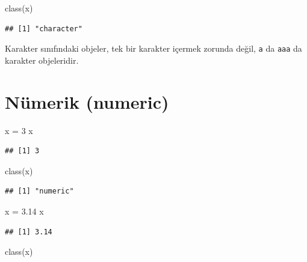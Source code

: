 \documentclass[
]{book}
\newenvironment{Shaded}{\begin{snugshade}}{\end{snugshade}}
\newcommand{\DecValTok}[1]{\textcolor[rgb]{0.00,0.00,0.81}{#1}}
\newcommand{\FloatTok}[1]{\textcolor[rgb]{0.00,0.00,0.81}{#1}}
\newcommand{\FunctionTok}[1]{\textcolor[rgb]{0.00,0.00,0.00}{#1}}
\newcommand{\NormalTok}[1]{#1}
\newcommand{\OtherTok}[1]{\textcolor[rgb]{0.56,0.35,0.01}{#1}}
\begin{document}
\begin{Shaded}
\begin{Highlighting}[]
\FunctionTok{class}\NormalTok{(x)}
\end{Highlighting}
\end{Shaded}

\begin{verbatim}
## [1] "character"
\end{verbatim}

Karakter sınıfındaki objeler, tek bir karakter içermek zorunda değil, \texttt{\textquotesingle{}a\textquotesingle{}} da \texttt{\textquotesingle{}aaa\textquotesingle{}} da karakter objeleridir.

\hypertarget{nuxfcmerik-numeric}{%
\section{Nümerik (numeric)}\label{nuxfcmerik-numeric}}

\begin{Shaded}
\begin{Highlighting}[]
\NormalTok{x }\OtherTok{=} \DecValTok{3}
\NormalTok{x}
\end{Highlighting}
\end{Shaded}

\begin{verbatim}
## [1] 3
\end{verbatim}

\begin{Shaded}
\begin{Highlighting}[]
\FunctionTok{class}\NormalTok{(x)}
\end{Highlighting}
\end{Shaded}

\begin{verbatim}
## [1] "numeric"
\end{verbatim}

\begin{Shaded}
\begin{Highlighting}[]
\NormalTok{x }\OtherTok{=} \FloatTok{3.14}
\NormalTok{x}
\end{Highlighting}
\end{Shaded}

\begin{verbatim}
## [1] 3.14
\end{verbatim}

\begin{Shaded}
\begin{Highlighting}[]
\FunctionTok{class}\NormalTok{(x)}
\end{Highlighting}
\end{Shaded}
\end{document}
